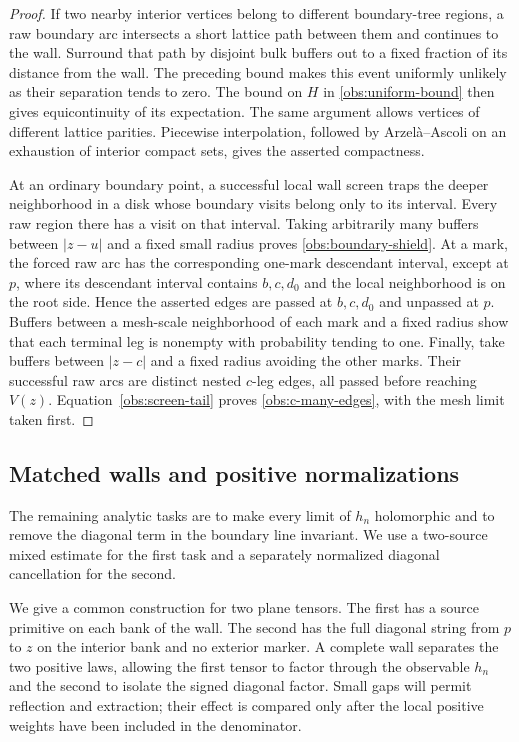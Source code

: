 \begin{proof}
If two nearby interior vertices belong to different boundary-tree
regions, a raw boundary arc intersects a short lattice path between
them and continues to the wall.  Surround that path by disjoint
bulk buffers out to a fixed fraction of its distance from the wall.
The preceding bound makes this event uniformly unlikely as their
separation tends to zero.  The bound on $H$ in
\eqref{obs:uniform-bound} then gives equicontinuity of its expectation.
The same argument allows vertices of different lattice parities.
Piecewise interpolation, followed by Arzel\`a--Ascoli on an exhaustion
of interior compact sets, gives the asserted compactness.

At an ordinary boundary point, a successful local wall screen traps
the deeper neighborhood in a disk whose boundary visits belong
only to its interval.  Every raw region there has a visit on that
interval.  Taking arbitrarily many buffers between $|z-u|$ and a
fixed small radius proves \eqref{obs:boundary-shield}.  At a mark,
the forced raw arc has the corresponding one-mark descendant
interval, except at $p$, where its descendant interval contains
$b,c,d_0$ and the local neighborhood is on the root side.  Hence
the asserted edges are passed at $b,c,d_0$ and unpassed at $p$.
Buffers between a mesh-scale neighborhood of each mark and a
fixed radius show that each terminal leg is nonempty with
probability tending to one.  Finally, take buffers between
$|z-c|$ and a fixed radius avoiding the other marks.  Their
successful raw arcs are distinct nested $c$-leg edges, all passed
before reaching $V(z)$.  Equation~\eqref{obs:screen-tail} proves
\eqref{obs:c-many-edges}, with the mesh limit taken first.
\end{proof}

\subsection{Matched walls and positive normalizations}
\label{obs:paired-walls}

The remaining analytic tasks are to make every limit of $h_n$
holomorphic and to remove the diagonal term in the boundary line
invariant.  We use a two-source mixed estimate for the first task
and a separately normalized diagonal cancellation for the second.

We give a common construction for two plane tensors.  The first has a
source primitive on each bank of the wall.  The second has the full
diagonal string from $p$ to $z$ on the interior bank and no exterior
marker.  A complete wall separates the two positive laws, allowing the
first tensor to factor through the observable $h_n$ and the second to
isolate the signed diagonal factor.  Small gaps will permit reflection
and extraction; their effect is compared only after the local positive
weights have been included in the denominator.

